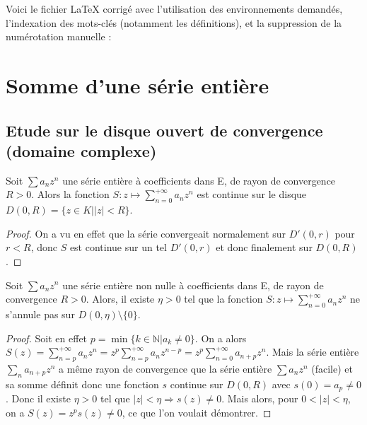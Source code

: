Voici le fichier LaTeX corrigé avec l'utilisation des environnements demandés, l'indexation des mots-clés (notamment les définitions), et la suppression de la numérotation manuelle :

\section{Somme d'une série entière}

\subsection{Etude sur le disque ouvert de convergence (domaine complexe)}

\begin{thm}
Soit $\sum a_nz^n$ une série entière à coefficients dans E, de rayon de convergence $R > 0$. Alors la fonction $S : z \mapsto \sum_{n=0}^{+\infty} a_nz^n$ est continue sur le disque $D(0,R) = \{z \in K | |z| < R\}$.
\end{thm}

\begin{proof}
On a vu en effet que la série convergeait normalement sur $D'(0,r)$ pour $r < R$, donc $S$ est continue sur un tel $D'(0,r)$ et donc finalement sur $D(0,R)$.
\end{proof}

\begin{thm}
Soit $\sum a_nz^n$ une série entière non nulle à coefficients dans E, de rayon de convergence $R > 0$. Alors, il existe $\eta > 0$ tel que la fonction $S : z \mapsto \sum_{n=0}^{+\infty} a_nz^n$ ne s'annule pas sur $D(0,\eta) \setminus \{0\}$.
\end{thm}

\begin{proof}
Soit en effet $p = \min\{k \in \mathbb{N} | a_k \neq 0\}$.
On a alors $S(z) = \sum_{n=p}^{+\infty} a_nz^n = z^p \sum_{n=p}^{+\infty} a_nz^{n-p} = z^p \sum_{n=0}^{+\infty} a_{n+p}z^n$. Mais la série entière $\sum_{n} a_{n+p}z^n$ a même rayon de convergence que la série entière $\sum a_nz^n$ (facile) et sa somme définit donc une fonction $s$ continue sur $D(0,R)$ avec $s(0) = a_p \neq 0$. Donc il existe $\eta > 0$ tel que $|z| < \eta \Rightarrow s(z) \neq 0$. Mais alors, pour $0 < |z| < \eta$, on a $S(z) = z^p s(z) \neq 0$, ce que l'on voulait démontrer.
\end{proof}

